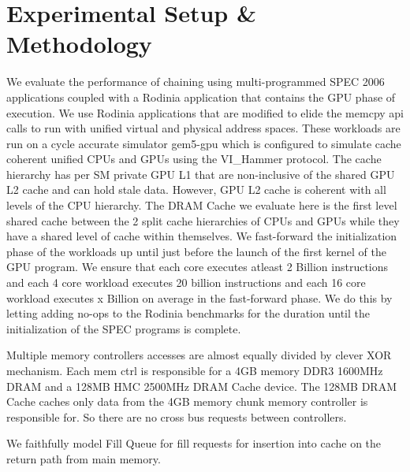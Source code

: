 \section{Experimental Setup \& Methodology} \label{methodology}
We evaluate the performance of chaining using multi-programmed SPEC 2006 applications coupled with a Rodinia application that contains the GPU phase of execution. We use Rodinia \cite{rodinia} applications that are modified to elide the memcpy api calls to run with unified virtual and physical address spaces. These workloads are run on a cycle accurate simulator gem5-gpu \cite{gem5-gpu} which is configured to simulate cache coherent unified CPUs and GPUs using the VI\_Hammer protocol. The cache hierarchy has per SM private GPU L1  that are non-inclusive of the shared GPU L2 cache and can hold stale data. However, GPU L2 cache is coherent with all levels of the CPU hierarchy.
The DRAM Cache we evaluate here is the first level shared cache between the 2 split cache hierarchies of CPUs and GPUs while they have a shared level of cache within themselves.
We fast-forward the initialization phase of the workloads up until just before the launch of the first kernel of the GPU program. We ensure that each core executes atleast 2 Billion instructions and each 4 core workload executes 20 billion instructions and each 16 core workload executes x Billion on average in the fast-forward phase. We do this by letting adding no-ops to the Rodinia benchmarks for the duration until the initialization of the SPEC programs is complete.

Multiple memory controllers accesses are almost equally divided by clever XOR mechanism. Each mem ctrl is responsible for a 4GB memory DDR3 1600MHz DRAM and a 128MB HMC 2500MHz DRAM Cache device. The 128MB DRAM Cache caches only data from the 4GB memory chunk memory controller is responsible for. So there are no cross bus requests between controllers.

We faithfully model Fill Queue for fill requests for insertion into cache on the return path from main memory. \cite{dca}